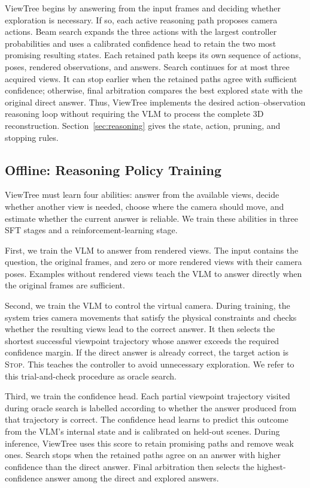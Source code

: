 \documentclass[sigconf,10pt]{acmart}
\newcommand{\system}{ViewTree\xspace}
\begin{document}
	\system begins by answering from the input frames and deciding whether exploration is necessary. If so, each active reasoning path proposes camera actions. Beam search expands the three actions with the largest controller probabilities and uses a calibrated confidence head to retain the two most promising resulting states. Each retained path keeps its own sequence of actions, poses, rendered observations, and answers. Search continues for at most three acquired views. It can stop earlier when the retained paths agree with sufficient confidence; otherwise, final arbitration compares the best explored state with the original direct answer. Thus, \system implements the desired action--observation reasoning loop without requiring the VLM to process the complete 3D reconstruction. Section~\ref{sec:reasoning} gives the state, action, pruning, and stopping rules.
	
	\subsection{Offline: Reasoning Policy Training}
	\label{sec:overview-training}
	ViewTree must learn four abilities: answer from the available views, decide whether another view is needed, choose where the camera should move, and estimate whether the current answer is reliable. We train these abilities in three SFT stages and a reinforcement-learning stage.
	
	First, we train the VLM to answer from rendered views. The input contains the question, the original frames, and zero or more rendered views with their camera poses. Examples without rendered views teach the VLM to answer directly when the original frames are sufficient.
	
	Second, we train the VLM to control the virtual camera. During training, the system tries camera movements that satisfy the physical constraints and checks whether the resulting views lead to the correct answer. It then selects the shortest successful viewpoint trajectory whose answer exceeds the required confidence margin. If the direct answer is already correct, the target action is \textsc{Stop}. This teaches the controller to avoid unnecessary exploration. We refer to this trial-and-check procedure as oracle search.
	
	Third, we train the confidence head. Each partial viewpoint trajectory visited during oracle search is labelled according to whether the answer produced from that trajectory is correct. The confidence head learns to predict this outcome from the VLM's internal state and is calibrated on held-out scenes. During inference, ViewTree uses this score to retain promising paths and remove weak ones. Search stops when the retained paths agree on an answer with higher confidence than the direct answer. Final arbitration then selects the highest-confidence answer among the direct and explored answers.
	
\end{document}
